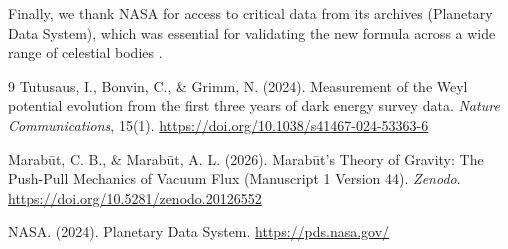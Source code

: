\documentclass[11pt, a4paper]{article}
\begin{document}
Finally, we thank NASA for access to critical data from its archives (Planetary Data System), which was essential for validating the new formula across a wide range of celestial bodies \cite{nasa2024}.

\clearpage
\begin{thebibliography}{9}
  Tutusaus, I., Bonvin, C., \& Grimm, N. (2024). Measurement of the Weyl potential evolution from the first three years of dark energy survey data. \textit{Nature Communications}, 15(1). \url{https://doi.org/10.1038/s41467-024-53363-6}

  Marab\={u}t, C. B., \& Marab\={u}t, A. L. (2026). Marab\={u}t's Theory of Gravity: The Push-Pull Mechanics of Vacuum Flux (Manuscript 1 Version 44). \textit{Zenodo}. \url{https://doi.org/10.5281/zenodo.20126552}

  NASA. (2024). Planetary Data System. \url{https://pds.nasa.gov/}
\end{thebibliography}
\end{document}
